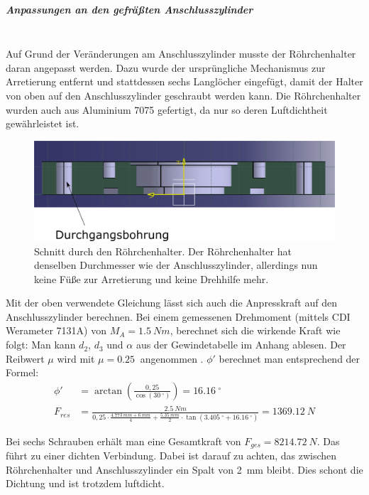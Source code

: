 \subparagraph{Anpassungen an den gefräßten Anschlusszylinder}
\hfill \\

Auf Grund der Veränderungen am Anschlusszylinder musste der Röhrchenhalter daran angepasst werden. Dazu  wurde der ursprüngliche Mechanismus zur Arretierung entfernt und stattdessen sechs Langlöcher eingefügt, damit der Halter von oben auf den Anschlusszylinder geschraubt werden kann. Die Röhrchenhalter wurden auch aus Aluminium 7075 gefertigt, da nur so deren Luftdichtheit gewährleistet ist.

\begin{figure}[h!]
	\begin{center}
		\includegraphics[scale=0.5]{Schnitt_RoehrchenhalterV2.png}
		\caption[Röhrchenhalter V2]{Schnitt durch den Röhrchenhalter. Der Röhrchenhalter hat denselben Durchmesser wie der Anschlusszylinder, allerdings nun keine Füße zur Arretierung und keine Drehhilfe mehr.}
	\end{center}
\end{figure}

Mit der oben verwendete Gleichung lässt sich auch die Anpresskraft auf den Anschlusszylinder berechnen. Bei einem gemessenen Drehmoment (mittels CDI Werameter 7131A) von $M_A = \SI{1,5}{Nm}$, berechnet sich die wirkende Kraft wie folgt: 
Man kann $d_2$, $d_3$ und $\alpha$ aus der Gewindetabelle im Anhang ablesen. Der Reibwert $\mu$ wird mit $\mu = \SI{0,25}{}$ angenommen \cite{GDV2011}. $\phi'$ berechnet man entsprechend der Formel:
\begin{align*}
	\phi' &= \arctan\left( \frac{0,25}{\cos(\SI{30}{^\circ})} \right) = \SI{16,16}{^\circ} \\
	F_{res} &= \frac{\SI{2,5}{Nm}}{0,25 \cdot \frac{\SI{4,773}{mm} + \SI{6}{mm}}{4} + \frac{\SI{5,35}{mm}}{2} \cdot \tan(\SI{3,405}{^\circ} + \SI{16,16}{^\circ})} = \SI{1369,12}{N}
\end{align*}

Bei sechs Schrauben erhält man eine Gesamtkraft von $F_{ges} = \SI{8214,72}{N}$. Das führt zu einer dichten Verbindung. Dabei ist darauf zu achten, das zwischen Röhrchenhalter und Anschlusszylinder ein Spalt von \SI{2}{mm} bleibt. Dies schont die Dichtung und ist trotzdem luftdicht.

